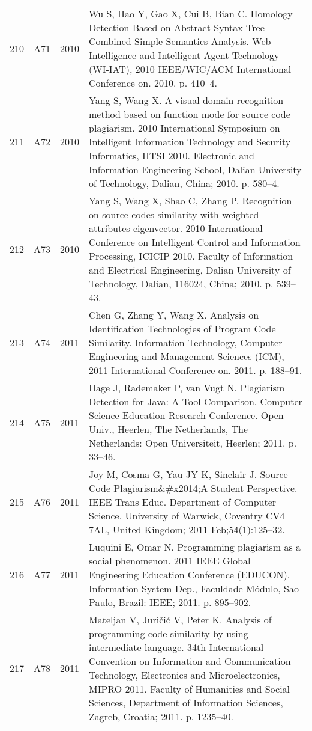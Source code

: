 \documentclass{article}\usepackage[]{graphicx}\usepackage[]{color}
\begin{document}
\begin{longtable}{l|L{1cm}|L{1cm}|L{12cm}|}
  210 & A71 & 2010 & Wu S, Hao Y, Gao X, Cui B, Bian C. Homology Detection Based on Abstract Syntax Tree Combined Simple Semantics Analysis. Web Intelligence and Intelligent Agent Technology (WI-IAT), 2010 IEEE/WIC/ACM International Conference on. 2010. p. 410–4. \\ 
  211 & A72 & 2010 & Yang S, Wang X. A visual domain recognition method based on function mode for source code plagiarism. 2010 International Symposium on Intelligent Information Technology and Security Informatics, IITSI 2010. Electronic and Information Engineering School, Dalian University of Technology, Dalian, China; 2010. p. 580–4. \\ 
  212 & A73 & 2010 & Yang S, Wang X, Shao C, Zhang P. Recognition on source codes similarity with weighted attributes eigenvector. 2010 International Conference on Intelligent Control and Information Processing, ICICIP 2010. Faculty of Information and Electrical Engineering, Dalian University of Technology, Dalian, 116024, China; 2010. p. 539–43. \\ 
  213 & A74 & 2011 & Chen G, Zhang Y, Wang X. Analysis on Identification Technologies of Program Code Similarity. Information Technology, Computer Engineering and Management Sciences (ICM), 2011 International Conference on. 2011. p. 188–91. \\ 
  214 & A75 & 2011 & Hage J, Rademaker P, van Vugt N. Plagiarism Detection for Java: A Tool Comparison. Computer Science Education Research Conference. Open Univ., Heerlen, The Netherlands, The Netherlands: Open Universiteit, Heerlen; 2011. p. 33–46. \\ 
  215 & A76 & 2011 & Joy M, Cosma G, Yau JY-K, Sinclair J. Source Code Plagiarism\&\#x2014;A Student Perspective. IEEE Trans Educ. Department of Computer Science, University of Warwick, Coventry CV4 7AL, United Kingdom; 2011 Feb;54(1):125–32. \\ 
  216 & A77 & 2011 & Luquini E, Omar N. Programming plagiarism as a social phenomenon. 2011 IEEE Global Engineering Education Conference (EDUCON). Information System Dep., Faculdade Módulo, Sao Paulo, Brazil: IEEE; 2011. p. 895–902. \\ 
  217 & A78 & 2011 & Mateljan V, Juričić V, Peter K. Analysis of programming code similarity by using intermediate language. 34th International Convention on Information and Communication Technology, Electronics and Microelectronics, MIPRO 2011. Faculty of Humanities and Social Sciences, Department of Information Sciences, Zagreb, Croatia; 2011. p. 1235–40. \\ 

\end{longtable}
\end{document}
